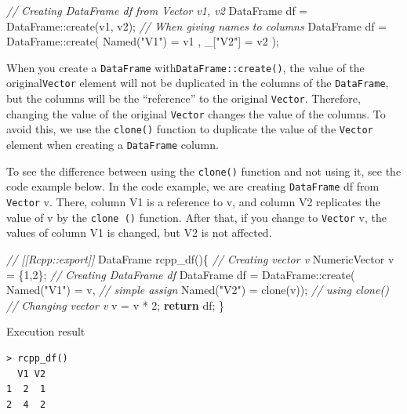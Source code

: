\documentclass[]{book}
\newenvironment{Shaded}{\begin{snugshade}}{\end{snugshade}}
\newcommand{\CommentTok}[1]{\textcolor[rgb]{0.56,0.35,0.01}{\textit{#1}}}
\newcommand{\ControlFlowTok}[1]{\textcolor[rgb]{0.13,0.29,0.53}{\textbf{#1}}}
\newcommand{\DecValTok}[1]{\textcolor[rgb]{0.00,0.00,0.81}{#1}}
\newcommand{\NormalTok}[1]{#1}
\newcommand{\StringTok}[1]{\textcolor[rgb]{0.31,0.60,0.02}{#1}}
\begin{document}
\begin{Shaded}
\begin{Highlighting}[]
\CommentTok{// Creating DataFrame df from Vector v1, v2}
\NormalTok{DataFrame df = DataFrame::create(v1, v2);}
\CommentTok{// When giving names to columns}
\NormalTok{DataFrame df = DataFrame::create( Named(}\StringTok{"V1"}\NormalTok{) = v1 , _[}\StringTok{"V2"}\NormalTok{] = v2 );}
\end{Highlighting}
\end{Shaded}

When you create a \texttt{DataFrame} with\texttt{DataFrame::create()}, the value of the original\texttt{Vector} element will not be duplicated in the columns of the \texttt{DataFrame}, but the columns will be the ``reference'' to the original \texttt{Vector}. Therefore, changing the value of the original \texttt{Vector} changes the value of the columns. To avoid this, we use the \texttt{clone()} function to duplicate the value of the \texttt{Vector} element when creating a \texttt{DataFrame} column.

To see the difference between using the \texttt{clone()} function and not using it, see the code example below. In the code example, we are creating \texttt{DataFrame} df from \texttt{Vector} v. There, column V1 is a reference to v, and column V2 replicates the value of v by the \texttt{clone\ ()} function. After that, if you change to \texttt{Vector} v, the values of column V1 is changed, but V2 is not affected.

\begin{Shaded}
\begin{Highlighting}[]
\CommentTok{// [[Rcpp::export]]}
\NormalTok{DataFrame rcpp_df()\{}
    \CommentTok{// Creating vector v}
\NormalTok{    NumericVector v = \{}\DecValTok{1}\NormalTok{,}\DecValTok{2}\NormalTok{\};}
    \CommentTok{// Creating DataFrame df}
\NormalTok{    DataFrame df = DataFrame::create( Named(}\StringTok{"V1"}\NormalTok{) = v,         }\CommentTok{// simple assign}
\NormalTok{                                      Named(}\StringTok{"V2"}\NormalTok{) = clone(v)); }\CommentTok{// using clone()}
    \CommentTok{// Changing vector v}
\NormalTok{    v = v * }\DecValTok{2}\NormalTok{;}
    \ControlFlowTok{return}\NormalTok{ df;}
\NormalTok{\}}
\end{Highlighting}
\end{Shaded}

Execution result

\begin{verbatim}
> rcpp_df()
  V1 V2
1  2  1
2  4  2
\end{verbatim}
\end{document}
